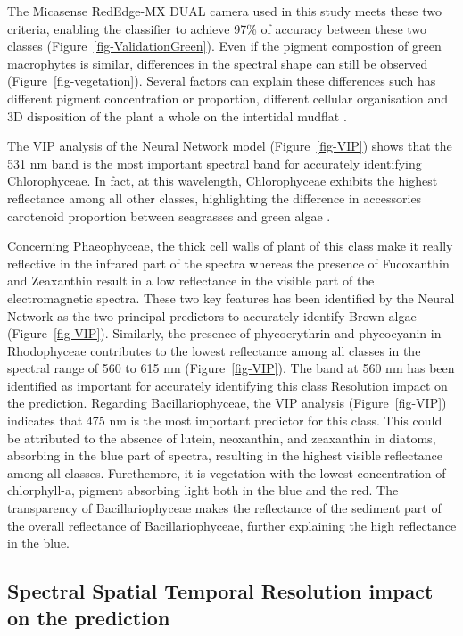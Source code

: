 \documentclass[
  number]{elsarticle}
\begin{document}
The Micasense RedEdge-MX DUAL camera used in this study meets these two
criteria, enabling the classifier to achieve 97\% of accuracy between
these two classes (Figure~\ref{fig-ValidationGreen}). Even if the
pigment compostion of green macrophytes is similar, differences in the
spectral shape can still be observed (Figure~\ref{fig-vegetation}).
Several factors can explain these differences such has different pigment
concentration or proportion, different cellular organisation and 3D
disposition of the plant a whole on the intertidal mudflat
\citep[\citep{kirk1994light},
\citep{hedley2018influence}]{beach1997vivo}.

The VIP analysis of the Neural Network model (Figure~\ref{fig-VIP})
shows that the 531 nm band is the most important spectral band for
accurately identifying Chlorophyceae. In fact, at this wavelength,
Chlorophyceae exhibits the highest reflectance among all other classes,
highlighting the difference in accessories carotenoid proportion between
seagrasses and green algae \citep{repolho2017seagrass}.

Concerning Phaeophyceae, the thick cell walls of plant of this class
make it really reflective in the infrared part of the spectra whereas
the presence of Fucoxanthin and Zeaxanthin result in a low reflectance
in the visible part of the electromagnetic spectra. These two key
features has been identified by the Neural Network as the two principal
predictors to accurately identify Brown algae (Figure~\ref{fig-VIP}).
Similarly, the presence of phycoerythrin and phycocyanin in Rhodophyceae
contributes to the lowest reflectance among all classes in the spectral
range of 560 to 615 nm (Figure~\ref{fig-VIP}). The band at 560 nm has
been identified as important for accurately identifying this class
Resolution impact on the prediction. Regarding Bacillariophyceae, the
VIP analysis (Figure~\ref{fig-VIP}) indicates that 475 nm is the most
important predictor for this class. This could be attributed to the
absence of lutein, neoxanthin, and zeaxanthin in diatoms, absorbing in
the blue part of spectra, resulting in the highest visible reflectance
among all classes. Furethemore, it is vegetation with the lowest
concentration of chlorphyll-a, pigment absorbing light both in the blue
and the red. The transparency of Bacillariophyceae makes the reflectance
of the sediment part of the overall reflectance of Bacillariophyceae,
further explaining the high reflectance in the blue.

\subsection{Spectral Spatial Temporal Resolution impact on the
prediction}\label{spectral-spatial-temporal-resolution-impact-on-the-prediction}
\end{document}

